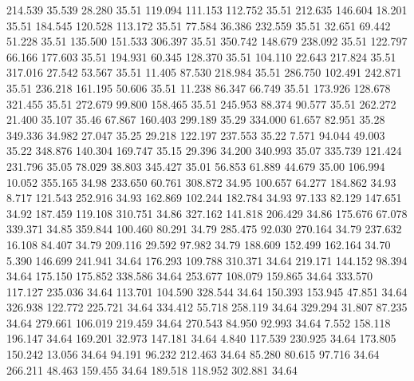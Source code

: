  214.539   35.539   28.280        35.51
 119.094  111.153  112.752        35.51
 212.635  146.604   18.201        35.51
 184.545  120.528  113.172        35.51
  77.584   36.386  232.559        35.51
  32.651   69.442   51.228        35.51
 135.500  151.533  306.397        35.51
 350.742  148.679  238.092        35.51
 122.797   66.166  177.603        35.51
 194.931   60.345  128.370        35.51
 104.110   22.643  217.824        35.51
 317.016   27.542   53.567        35.51
  11.405   87.530  218.984        35.51
 286.750  102.491  242.871        35.51
 236.218  161.195   50.606        35.51
  11.238   86.347   66.749        35.51
 173.926  128.678  321.455        35.51
 272.679   99.800  158.465        35.51
 245.953   88.374   90.577        35.51
 262.272   21.400   35.107        35.46
  67.867  160.403  299.189        35.29
 334.000   61.657   82.951        35.28
 349.336   34.982   27.047        35.25
  29.218  122.197  237.553        35.22
   7.571   94.044   49.003        35.22
 348.876  140.304  169.747        35.15
  29.396   34.200  340.993        35.07
 335.739  121.424  231.796        35.05
  78.029   38.803  345.427        35.01
  56.853   61.889   44.679        35.00
 106.994   10.052  355.165        34.98
 233.650   60.761  308.872        34.95
 100.657   64.277  184.862        34.93
   8.717  121.543  252.916        34.93
 162.869  102.244  182.784        34.93
  97.133   82.129  147.651        34.92
 187.459  119.108  310.751        34.86
 327.162  141.818  206.429        34.86
 175.676   67.078  339.371        34.85
 359.844  100.460   80.291        34.79
 285.475   92.030  270.164        34.79
 237.632   16.108   84.407        34.79
 209.116   29.592   97.982        34.79
 188.609  152.499  162.164        34.70
   5.390  146.699  241.941        34.64
 176.293  109.788  310.371        34.64
 219.171  144.152   98.394        34.64
 175.150  175.852  338.586        34.64
 253.677  108.079  159.865        34.64
 333.570  117.127  235.036        34.64
 113.701  104.590  328.544        34.64
 150.393  153.945   47.851        34.64
 326.938  122.772  225.721        34.64
 334.412   55.718  258.119        34.64
 329.294   31.807   87.235        34.64
 279.661  106.019  219.459        34.64
 270.543   84.950   92.993        34.64
   7.552  158.118  196.147        34.64
 169.201   32.973  147.181        34.64
   4.840  117.539  230.925        34.64
 173.805  150.242   13.056        34.64
  94.191   96.232  212.463        34.64
  85.280   80.615   97.716        34.64
 266.211   48.463  159.455        34.64
 189.518  118.952  302.881        34.64

